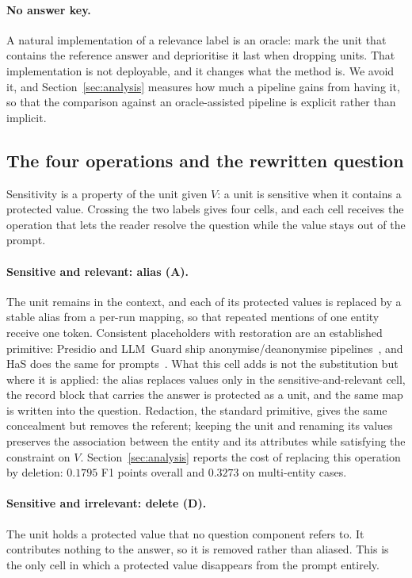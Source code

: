 \paragraph{No answer key.}
A natural implementation of a relevance label is an oracle: mark the unit that contains the
reference answer and deprioritise it last when dropping units. That implementation is not
deployable, and it changes what the method is. We avoid it, and
Section~\ref{sec:analysis} measures how much a pipeline gains from having it, so that the
comparison against an oracle-assisted pipeline is explicit rather than implicit.

\subsection{The four operations and the rewritten question}

Sensitivity is a property of the unit given $V$: a unit is sensitive when it contains a
protected value. Crossing the two labels gives four cells, and each cell receives the
operation that lets the reader resolve the question while the value stays out of the prompt.

\paragraph{Sensitive and relevant: alias (\textbf{A}).}
The unit remains in the context, and each of its protected values is replaced by a stable
alias from a per-run mapping, so that repeated mentions of one entity receive one token.
Consistent placeholders with restoration are an established primitive: Presidio and LLM~Guard
ship anonymise/deanonymise pipelines~\cite{presidio,llmguard}, and {\sc HaS} does the same for
prompts~\cite{chen-has-2023}. What this cell adds is not the substitution but where it is applied:
the alias replaces values only in the sensitive-and-relevant cell, the record block that carries the
answer is protected as a unit, and the same map is written into the question. Redaction, the
standard primitive, gives the same concealment but removes the referent; keeping the unit and
renaming its values preserves the association between the entity and its attributes while
satisfying the constraint on $V$. Section~\ref{sec:analysis} reports the cost of replacing this operation by
deletion: $0.1795$ F1 points overall and $0.3273$ on multi-entity cases.

\paragraph{Sensitive and irrelevant: delete (\textbf{D}).}
The unit holds a protected value that no question component refers to. It contributes
nothing to the answer, so it is removed rather than aliased. This is the only cell in which a
protected value disappears from the prompt entirely.

